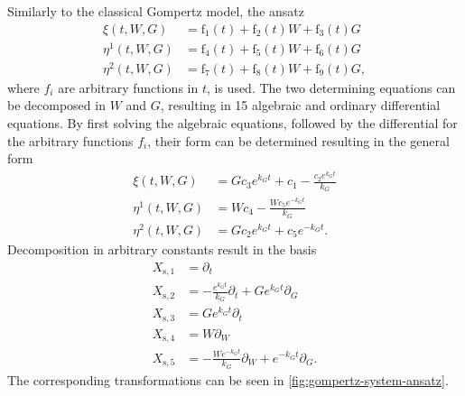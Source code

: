 Similarly to the classical Gompertz model, the ansatz
\begin{align*}
  \xi{\left(t,W,G \right)} &= \operatorname{f_{1}}{\left(t \right)} + \operatorname{f_{2}}{\left(t \right)} W + \operatorname{f_{3}}{\left(t \right)} G \\
  \eta^{1}{\left(t,W,G \right)} &= \operatorname{f_{4}}{\left(t \right)} + \operatorname{f_{5}}{\left(t \right)} W + \operatorname{f_{6}}{\left(t \right)} G\\
  \eta^{2}{\left(t,W,G \right)} &= \operatorname{f_{7}}{\left(t \right)} + \operatorname{f_{8}}{\left(t \right)} W + \operatorname{f_{9}}{\left(t \right)} G,
\end{align*}
where \(f_i\) are arbitrary functions in \(t\), is used.
The two determining equations can be decomposed in \(W\) and \(G\), resulting in 15 algebraic and ordinary differential equations.
By first solving the algebraic equations, followed by the differential for the arbitrary functions \(f_i\), their form can be determined resulting in the general form
\begin{align*}
  \xi{\left(t,W,G \right)} &= G c_{3} e^{k_{G} t} + c_{1} - \frac{c_{2} e^{k_{G} t}}{k_{G}} \\
  \eta^{1}{\left(t,W,G \right)} &= W c_{4} - \frac{W c_{5} e^{- k_{G} t}}{k_{G}} \\
  \eta^{2}{\left(t,W,G \right)} &= G c_{2} e^{k_{G} t} + c_{5} e^{- k_{G} t}.
\end{align*}
Decomposition in arbitrary constants result in the basis
\begin{align*}
  X_{\text{s},1} &= \partial_t \\
  X_{\text{s},2} &= - \frac{e^{k_{G} t}}{k_{G}} \partial_t + G e^{k_{G} t} \partial_G \\
  X_{\text{s},3} &= G e^{k_{G} t} \partial_t \\
  X_{\text{s},4} &= W \partial_W \\
  X_{\text{s},5} &= - \frac{W e^{- k_{G} t}}{k_{G}} \partial_W + e^{- k_{G} t} \partial_G.
\end{align*}
The corresponding transformations can be seen in \cref{fig:gompertz-system-ansatz}.
